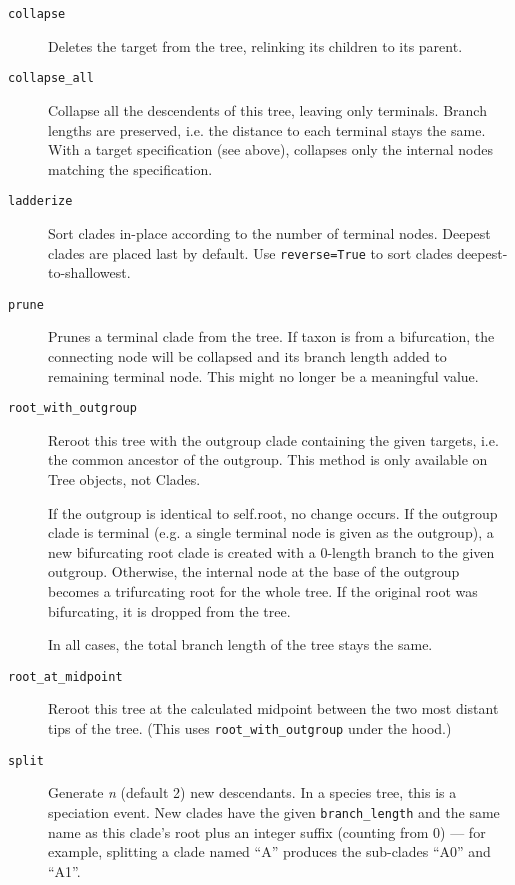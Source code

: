 \documentclass{report}
\begin{document}
\begin{description}
  \item[\texttt{collapse}]
    Deletes the target from the tree, relinking its children to its parent.

  \item[\texttt{collapse\_all}]
    Collapse all the descendents of this tree, leaving only terminals. Branch lengths are
    preserved, i.e. the distance to each terminal stays the same. With a target specification
    (see above), collapses only the internal nodes matching the specification.

  \item[\texttt{ladderize}]
    Sort clades in-place according to the number of terminal nodes.  Deepest clades are placed
    last by default. Use \verb|reverse=True| to sort clades deepest-to-shallowest.

  \item[\texttt{prune}]
    Prunes a terminal clade from the tree.  If taxon is from a bifurcation, the connecting node
    will be collapsed and its branch length added to remaining terminal node. This might no
    longer be a meaningful value.

  \item[\texttt{root\_with\_outgroup}]
    Reroot this tree with the outgroup clade containing the given targets, i.e. the common
    ancestor of the outgroup. This method is only available on Tree objects, not Clades.

    If the outgroup is identical to self.root, no change occurs. If the outgroup clade is
    terminal (e.g. a single terminal node is given as the outgroup), a new bifurcating root
    clade is created with a 0-length branch to the given outgroup. Otherwise, the internal node
    at the base of the outgroup becomes a trifurcating root for the whole tree. If the original
    root was bifurcating, it is dropped from the tree.

    In all cases, the total branch length of the tree stays the same.

  \item[\texttt{root\_at\_midpoint}]
    Reroot this tree at the calculated midpoint between the two most distant
    tips of the tree. (This uses \verb|root_with_outgroup| under the hood.)

  \item[\texttt{split}]
    Generate \textit{n} (default 2) new descendants. In a species tree, this is a speciation
    event.  New clades have the given \verb|branch_length| and the same name as this clade's
    root plus an integer suffix (counting from 0) --- for example, splitting a clade named
    ``A'' produces the sub-clades ``A0'' and ``A1''.

\end{description}
\end{document}
